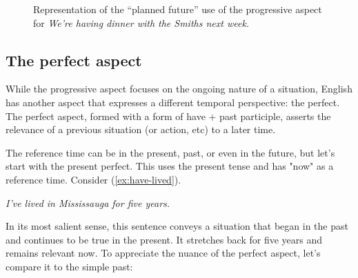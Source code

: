 \begin{figure}[ht]
    \centering
    \caption{Representation of the ``planned future'' use of the progressive aspect for \textit{We're having dinner with the Smiths next week.}}
    \label{fig:futurate-progressive}
\end{figure}

\subsection{The perfect aspect}\label{sec:perfect-aspect}
While the progressive aspect focuses on the ongoing nature of a situation, English has another aspect that expresses a different temporal perspective: the perfect. The perfect aspect, formed with a form of have + past participle, asserts the relevance of a previous situation (or action, etc) to a later time.

The reference time can be in the present, past, or even in the future, but let's start with the present perfect. This uses the present tense and has "now" as a reference time. Consider (\ref{ex:have-lived}).

\ea \textit{I've lived in Mississauga for five years.}\label{ex:have-lived}
\z

In its most salient sense, this sentence conveys a situation that began in the past and continues to be true in the present. It stretches back for five years and remains relevant now. To appreciate the nuance of the perfect aspect, let's compare it to the simple past:


